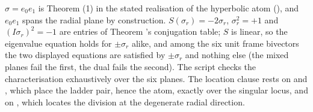 $\sigma = e_0 e_1$ is Theorem (1) in the stated realisation of the hyperbolic atom (), and $e_0 e_1$ spans the radial plane by construction. $S(\sigma_r) = -2\sigma_r$, $\sigma_r^2 = +1$ and $(I\sigma_r)^2 = -1$ are entries of Theorem 's conjugation table; $S$ is linear, so the eigenvalue equation holds for $\pm\sigma_r$ alike, and among the six unit frame bivectors the two displayed equations are satisfied by $\pm\sigma_r$ and nothing else (the mixed planes fail the first, the dual fails the second). The script checks the characterisation exhaustively over the six planes. The location clause rests on  and , which place the ladder pair, hence the atom, exactly over the singular locus, and on , which locates the division at the degenerate radial direction.
